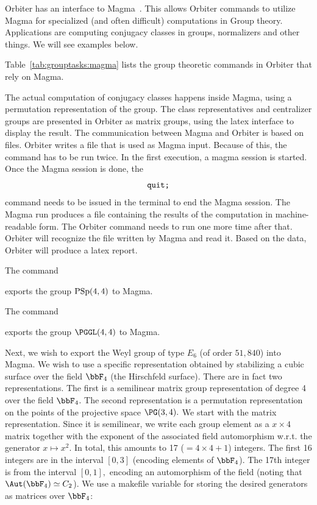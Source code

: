 Orbiter has an interface to Magma~\cite{Magma}. 
This allows Orbiter commands to utilize Magma 
for specialized (and often difficult) computations 
in Group theory.
Applications are computing conjugacy classes in groups, 
normalizers and other things.
We will see examples below.

\bigskip


Table~\ref{tab:grouptasks:magma} 
lists the group theoretic commands in Orbiter 
that rely on Magma.


The actual computation of conjugacy classes happens inside Magma, 
using a permutation representation of the group. 
The class representatives and centralizer groups 
are presented in Orbiter as matrix groups, using the latex interface 
to display the result.
The communication between Magma and Orbiter is based on files. 
Orbiter writes a file that is used as Magma input. 
Because of this, the command has to be run twice. 
In the first execution, a magma session is started. 
Once the Magma session is done, the 
$$
\verb'quit;'
$$
command needs to be issued in the terminal to end the Magma session.
The Magma run produces a file containing the results 
of the computation in machine-readable form.
The Orbiter command needs to run one more time after that. 
Orbiter will recognize the file written by Magma and read it. 
Based on the data, Orbiter will produce a latex report.

\bigskip

The command  


exports the group ${\rm PSp}(4,4)$ to Magma. 



\bigskip

The command  


exports the group $\PGGL(4,4)$ to Magma. 



\bigskip

Next, we wish to export the Weyl group of type $E_6$ (of order $51,840$) into Magma. 
We wish to use a specific representation obtained by 
stabilizing a cubic surface over the field $\bbF_4$ (the Hirschfeld surface). 
There are in fact two representations. The first is a semilinear matrix group representation of degree 4 
over the field $\bbF_4$. The second representation is a permutation representation on the points of the projective space $\PG(3,4).$
We start with the matrix representation. Since it is semilinear, 
we write each group element as a $x \times 4$ matrix together 
with the exponent of the associated field automorphism w.r.t. the generator $x \mapsto x^2$.  
In total, this amounts to 17 ($=4\times 4 +1 $) integers. The first 16 integers 
are in the interval $[0,3]$ (encoding elements of $\bbF_4$). 
The 17th integer is from the interval $[0,1],$ encoding an automorphism of the field 
(noting that $\Aut(\bbF_4)\simeq C_2$).
We use a makefile variable for storing the desired generators as matrices over $\bbF_4$:

